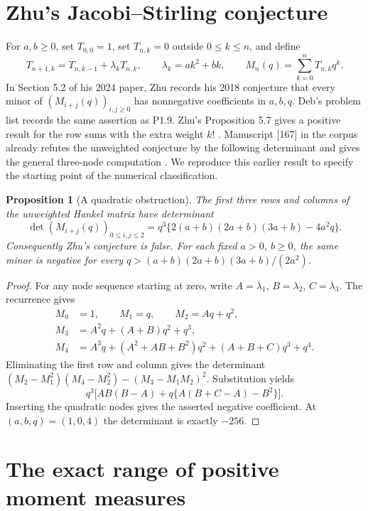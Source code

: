 \documentclass[11pt]{article}
\theoremstyle{plain}\newtheorem{theorem}{Theorem}[section]\newtheorem{lemma}[theorem]{Lemma}\newtheorem{corollary}[theorem]{Corollary}\newtheorem{proposition}[theorem]{Proposition}
\numberwithin{equation}{section}
\begin{document}
\appendix
\section{Zhu's Jacobi--Stirling conjecture}

For $a,b\geq 0$, set $T_{0,0}=1$, set $T_{n,k}=0$ outside
$0\leq k\leq n$, and define
\[
 T_{n+1,k}=T_{n,k-1}+\lambda_k T_{n,k},\qquad
 \lambda_k=ak^2+bk,\qquad M_n(q)=\sum_{k=0}^nT_{n,k}q^k .
\]
In Section 5.2 of his 2024 paper, Zhu records his 2018 conjecture
that every minor of $(M_{i+j}(q))_{i,j\geq0}$ has nonnegative
coefficients in $a,b,q$. Deb's problem list records the same assertion
as P1.9. Zhu's Proposition 5.7 gives a positive result for the row sums
with the extra weight $k!$ \cite{zhu,deb}. Manuscript [167] in the corpus already refutes the unweighted conjecture by the following determinant and gives the general three-node computation \cite{vmrc}. We reproduce this earlier result to specify the starting point of the numerical classification.

\begin{proposition}[A quadratic obstruction]
The first three rows and columns of the unweighted Hankel matrix have determinant
\[
 \det(M_{i+j}(q))_{0\leq i,j\leq2}
 =q^3\{2(a+b)(2a+b)(3a+b)-4a^2q\}.
\]
Consequently Zhu's conjecture is false. For each fixed $a>0$, $b\geq0$,
the same minor is negative for every $q>(a+b)(2a+b)(3a+b)/(2a^2)$.
\end{proposition}
\begin{proof}
For any node sequence starting at zero, write $A=\lambda_1$,
$B=\lambda_2$, $C=\lambda_3$. The recurrence gives
\[
\begin{aligned}
 M_0&=1,\qquad M_1=q,\qquad M_2=Aq+q^2,\\
 M_3&=A^2q+(A+B)q^2+q^3,\\
 M_4&=A^3q+(A^2+AB+B^2)q^2+(A+B+C)q^3+q^4.
\end{aligned}
\]
Eliminating the first row and column gives the determinant
$(M_2-M_1^2)(M_4-M_2^2)-(M_3-M_1M_2)^2$. Substitution yields
\[
 q^3\bigl[AB(B-A)+q\{A(B+C-A)-B^2\}\bigr].
\]
Inserting the quadratic nodes gives the asserted negative coefficient.
At $(a,b,q)=(1,0,4)$ the determinant is exactly $-256$.
\end{proof}

\section{The exact range of positive moment measures}
\end{document}
